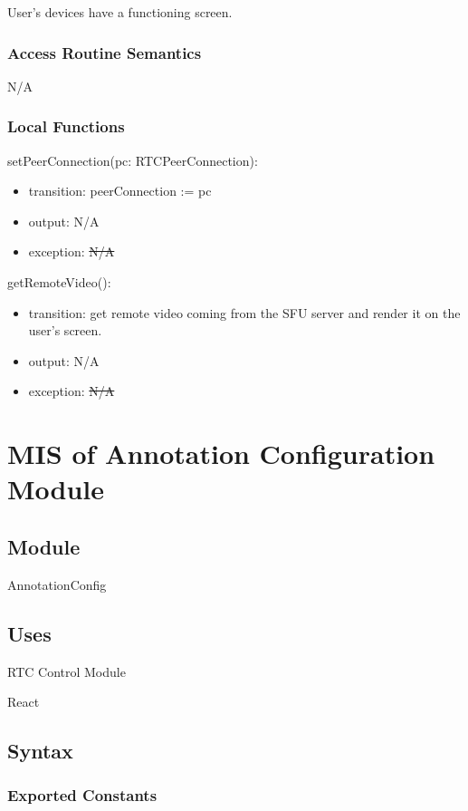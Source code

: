 \documentclass[12pt, titlepage]{article}
\newcommand{\rt}[1]{\textcolor{red}{#1}}
\begin{document}
User's devices have a functioning screen.

\subsubsection{Access Routine Semantics}

N/A

\subsubsection{Local Functions}

\noindent setPeerConnection(pc: RTCPeerConnection):
\begin{itemize}
\item transition: peerConnection := pc
\item output: N/A
\item exception: \sout{N/A} \rt{}
\end{itemize}

\noindent getRemoteVideo():
\begin{itemize}
\item transition: get remote video coming from the SFU server and render it on the
  user's screen.
\item output: N/A
\item exception: \sout{N/A} \rt{}
\end{itemize}


\section{MIS of Annotation Configuration Module} \label{sec:annoconfig}

\subsection{Module}

AnnotationConfig

\subsection{Uses}

\noindent RTC Control Module

\noindent React

\subsection{Syntax}

\subsubsection{Exported Constants}
\end{document}

